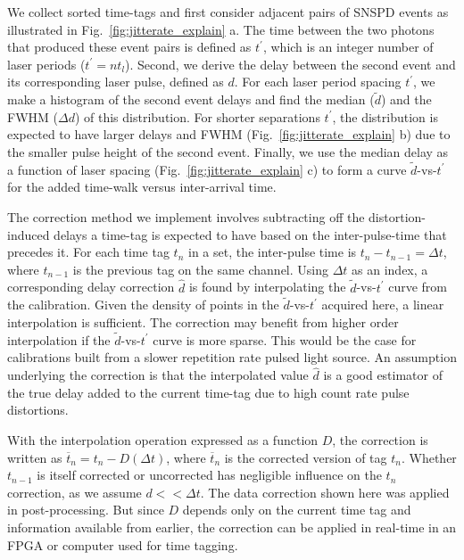 \documentclass[11pt]{caltech_thesis} %
\begin{document}
We collect sorted time-tags and first consider adjacent pairs of SNSPD
events as illustrated in Fig.~\ref{fig:jitterate_explain} a. The time
between the two photons that produced these event pairs is defined as
$t^\prime$, which is an integer number of laser periods
($t^\prime = n t_{l}$). Second, we derive the delay between the second
event and its corresponding laser pulse, defined as $d$. For each laser
period spacing $t^\prime$, we make a histogram of the second event
delays and find the median ($\tilde{d}$) and the FWHM ($\Delta {d}$) of
this distribution. For shorter separations $t^\prime$, the distribution
is expected to have larger delays and FWHM
(Fig.~\ref{fig:jitterate_explain} b) due to the smaller pulse height of
the second event. Finally, we use the median delay as a function of
laser spacing (Fig.~\ref{fig:jitterate_explain} c) to form a curve
$\tilde{d}$-vs-$t^\prime$ for the added time-walk versus inter-arrival
time.

The correction method we implement involves subtracting off the
distortion-induced delays a time-tag is expected to have based on the
inter-pulse-time that precedes it. For each time tag $t_n$ in a set, the
inter-pulse time is $t_n - t_{n-1} = \Delta t$, where $t_{n-1}$ is the
previous tag on the same channel. Using $\Delta t$ as an index, a
corresponding delay correction $\hat{d}$ is found by interpolating the
$\tilde{d}$-vs-$t^\prime$ curve from the calibration. Given the density
of points in the $\tilde{d}$-vs-$t^\prime$ acquired here, a linear
interpolation is sufficient. The correction may benefit from higher
order interpolation if the $\tilde{d}$-vs-$t^\prime$ curve is more
sparse. This would be the case for calibrations built from a slower
repetition rate pulsed light source. An assumption underlying the
correction is that the interpolated value $\hat{d}$ is a good estimator
of the true delay added to the current time-tag due to high count rate
pulse distortions.

With the interpolation operation expressed as a function $D$, the
correction is written as $\overline{t}_n = t_n - D(\Delta t)$, where
$\overline{t}_n$ is the corrected version of tag $t_n$. Whether
$t_{n-1}$ is itself corrected or uncorrected has negligible influence on
the $t_n$ correction, as we assume $d << \Delta t$. The data correction
shown here was applied in post-processing. But since $D$ depends only on
the current time tag and information available from earlier, the
correction can be applied in real-time in an FPGA or computer used for
time tagging.
\end{document}
